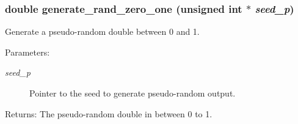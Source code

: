 \subsubsection{\setlength{\rightskip}{0pt plus 5cm}double generate\_\-rand\_\-zero\_\-one (unsigned int $\ast$ {\em seed\_\-p})}\label{misc_8c_f9f12f93187ca0cfde6a123b7ed8a413}


Generate a pseudo-random double between 0 and 1.

\begin{Desc}
\item[Parameters:]
\begin{description}
\item[{\em seed\_\-p}]Pointer to the seed to generate pseudo-random output. \end{description}
\end{Desc}
\begin{Desc}
\item[Returns:]The pseudo-random double in between 0 to 1. \end{Desc}
